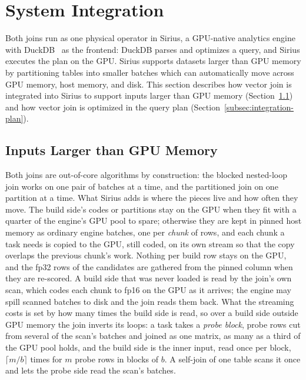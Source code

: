 \section{System Integration}\label{sec:integration}

Both joins run as one physical operator in Sirius, a GPU-native analytics engine with DuckDB~\cite{Yogatama26} as the frontend: DuckDB parses and optimizes a query, and Sirius executes the plan on the GPU.
Sirius supports datasets larger than GPU memory by partitioning tables into smaller batches which can automatically move across GPU memory, host memory, and disk.
This section describes how vector join is integrated into Sirius to support inputs larger than GPU memory (Section~\ref{subsec:integration-ooc}) and how vector join is optimized in the query plan (Section~\ref{subsec:integration-plan}).

\subsection{Inputs Larger than GPU Memory}\label{subsec:integration-ooc}

Both joins are out-of-core algorithms by construction: the blocked nested-loop join works on one pair of batches at a time, and the partitioned join on one partition at a time.
What Sirius adds is where the pieces live and how often they move.
The build side's codes or partitions stay on the GPU when they fit with a quarter of the engine's GPU pool to spare; otherwise they are kept in pinned host memory as ordinary engine batches, one per \emph{chunk} of rows, and each chunk a task needs is copied to the GPU, still coded, on its own stream so that the copy overlaps the previous chunk's work.
Nothing per build row stays on the GPU, and the fp32 rows of the candidates are gathered from the pinned column when they are re-scored.
A build side that was never loaded is read by the join's own scan, which codes each chunk to fp16 on the GPU as it arrives; the engine may spill scanned batches to disk and the join reads them back.
What the streaming costs is set by how many times the build side is read, so over a build side outside GPU memory the join inverts its loops: a task takes a \emph{probe block}, probe rows cut from several of the scan's batches and joined as one matrix, as many as a third of the GPU pool holds, and the build side is the inner input, read once per block, $\lceil m/b\rceil$ times for $m$ probe rows in blocks of $b$.
A self-join of one table scans it once and lets the probe side read the scan's batches.

